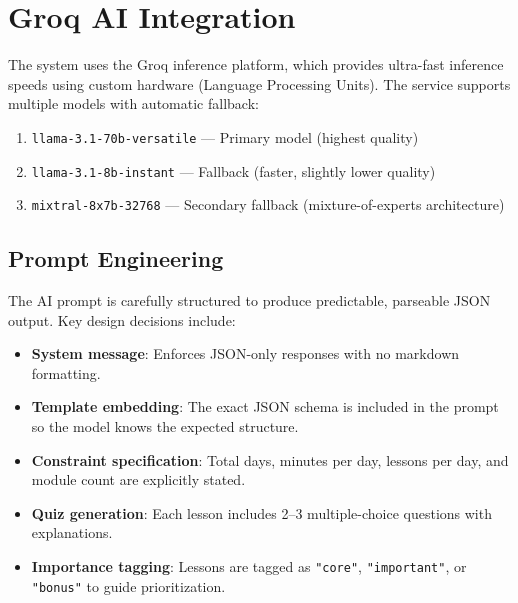 \documentclass[12pt,a4paper]{report}
\begin{document}
\section{Groq AI Integration}
The system uses the Groq inference platform, which provides ultra-fast inference speeds using custom hardware (Language Processing Units). The service supports multiple models with automatic fallback:

\begin{enumerate}[noitemsep]
    \item \texttt{llama-3.1-70b-versatile} — Primary model (highest quality)
    \item \texttt{llama-3.1-8b-instant} — Fallback (faster, slightly lower quality)
    \item \texttt{mixtral-8x7b-32768} — Secondary fallback (mixture-of-experts architecture)
\end{enumerate}

\subsection{Prompt Engineering}
The AI prompt is carefully structured to produce predictable, parseable JSON output. Key design decisions include:

\begin{itemize}[noitemsep]
    \item \textbf{System message}: Enforces JSON-only responses with no markdown formatting.
    \item \textbf{Template embedding}: The exact JSON schema is included in the prompt so the model knows the expected structure.
    \item \textbf{Constraint specification}: Total days, minutes per day, lessons per day, and module count are explicitly stated.
    \item \textbf{Quiz generation}: Each lesson includes 2--3 multiple-choice questions with explanations.
    \item \textbf{Importance tagging}: Lessons are tagged as \texttt{"core"}, \texttt{"important"}, or \texttt{"bonus"} to guide prioritization.
\end{itemize}
\end{document}
